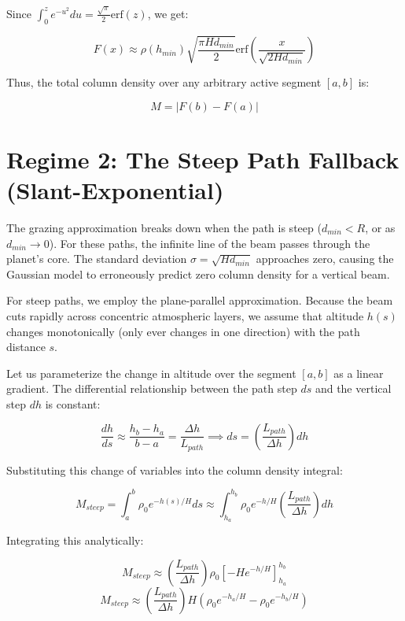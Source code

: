 ﻿\documentclass[12pt,a4paper]{article}
\begin{document}
Since $\int_0^z e^{-u^2} du = \frac{\sqrt{\pi}}{2} \text{erf}(z)$, we get:

\begin{equation}
F(x) \approx \rho(h_{min}) \sqrt{\frac{\pi H d_{min}}{2}} \text{erf}\left( \frac{x}{\sqrt{2 H d_{min}}} \right)
\end{equation}

Thus, the total column density over any arbitrary active segment $[a, b]$ is:

\begin{equation}
M = |F(b) - F(a)|
\end{equation}

\section{Regime 2: The Steep Path Fallback (Slant-Exponential)}
The grazing approximation breaks down when the path is steep ($d_{min} < R$, or as $d_{min} \to 0$). For these paths, the infinite line of the beam passes through the planet's core. The standard deviation $\sigma = \sqrt{H d_{min}}$ approaches zero, causing the Gaussian model to erroneously predict zero column density for a vertical beam.

For steep paths, we employ the plane-parallel approximation. Because the beam cuts rapidly across concentric atmospheric layers, we assume that altitude $h(s)$ changes monotonically (only ever changes in one direction) with the path distance $s$. 

Let us parameterize the change in altitude over the segment $[a, b]$ as a linear gradient. The differential relationship between the path step $ds$ and the vertical step $dh$ is constant:

\begin{equation}
\frac{dh}{ds} \approx \frac{h_b - h_a}{b - a} = \frac{\Delta h}{L_{path}} \implies ds = \left( \frac{L_{path}}{\Delta h} \right) dh
\end{equation}

Substituting this change of variables into the column density integral:

\begin{equation}
M_{steep} = \int_{a}^{b} \rho_0 e^{-h(s)/H} ds \approx \int_{h_a}^{h_b} \rho_0 e^{-h/H} \left( \frac{L_{path}}{\Delta h} \right) dh
\end{equation}

Integrating this analytically:

\begin{equation}
M_{steep} \approx \left( \frac{L_{path}}{\Delta h} \right) \rho_0 \left[ -H e^{-h/H} \right]_{h_a}^{h_b}
\end{equation}
\begin{equation}
M_{steep} \approx \left( \frac{L_{path}}{\Delta h} \right) H \left( \rho_0 e^{-h_a/H} - \rho_0 e^{-h_b/H} \right)
\end{equation}
\end{document}
